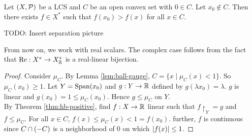 \documentclass{article}
\begin{document}
\begin{thm}\label{thm:hb-separation-point}
  Let $(X, \mathcal P)$ be a LCS and $C$ be an open convex set with $0 \in C$. Let $x_0 \nin C$. Then there exists $f \in X^*$ such that $f(x_0) > f(x)$ for all $x \in C$.
\end{thm}
TODO: Insert separation picture
\begin{rmk}
  From now on, we work with real scalars. The complex case follows from the fact that $\operatorname{Re} : X^* \to X_\mathbb R^*$ is a real-linear bijection.
\end{rmk}
\begin{proof}
  Consider $\mu_C$. By Lemma \ref{lem:ball-gauge}, $C = \{x \mid \mu_C(x) < 1\}$. So $\mu_C(x_0) \ge 1$. Let $Y = \operatorname{Span}(x_0)$ and $g : Y \to \mathbb R$ defined by $g(\lambda x_0) = \lambda$. $g$ is linear and $g(x_0) = 1 \le \mu_C(x_0)$. Hence $g \le \mu_C$ on $Y$. \\
  By Theorem \ref{thm:hb-positive}, find $ f : X \to \mathbb R$ linear such that $f\restriction_Y = g$ and $f \le \mu_C$. For all $x \in C$, $f(x) \le \mu_C(x) < 1 = f(x_0)$. further, $f$ is continuous since $C \cap (-C)$ is a neighborhood of $0$ on which $\left\lvert f(x)\right\rvert \le 1$.
\end{proof}
\end{document}
